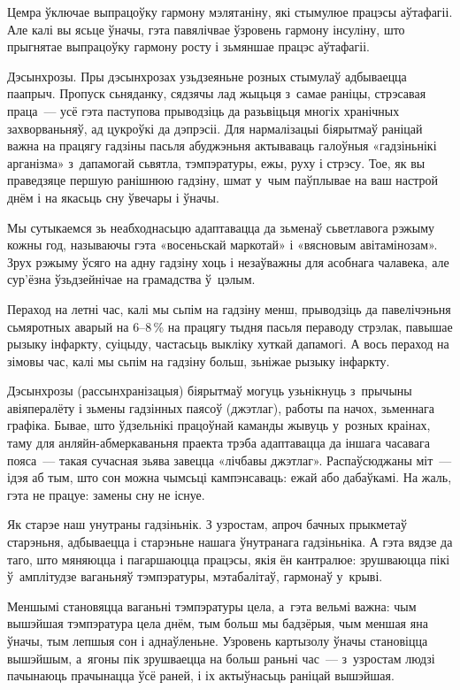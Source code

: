 Цемра ўключае выпрацоўку гармону мэлятаніну, які стымулюе працэсы аўтафагіі. Але калі вы ясьце ўначы, гэта павялічвае ўзровень гармону інсуліну, што прыгнятае выпрацоўку гармону росту і зьмяншае працэс аўтафагіі.

Дэсынхрозы. Пры дэсынхрозах узьдзеяньне розных стымулаў адбываецца паапрыч. Пропуск сьняданку, сядзячы лад жыцьця з~самае раніцы, стрэсавая праца~--- усё гэта паступова прыводзіць да разьвіцьця многіх хранічных захворваньняў, ад цукроўкі да дэпрэсіі. Для нармалізацыі біярытмаў раніцай важна на працягу гадзіны пасьля абуджэньня актываваць галоўныя «гадзіньнікі арганізма» з~дапамогай сьвятла, тэмпэратуры, ежы, руху і стрэсу. Тое, як вы праведзяце першую ранішнюю гадзіну, шмат у~чым паўплывае на ваш настрой днём і на якасьць сну ўвечары і ўначы.

Мы сутыкаемся зь неабходнасьцю адаптавацца да зьменаў сьветлавога рэжыму кожны год, называючы гэта «восеньскай маркотай» і «вясновым авітамінозам». Зрух рэжыму ўсяго на адну гадзіну хоць і незаўважны для асобнага чалавека, але сур'ёзна ўзьдзейнічае на грамадства ў~цэлым.

Пераход на летні час, калі мы сьпім на гадзіну менш, прыводзіць да павелічэньня сьмяротных аварый на 6--8\,\% на працягу тыдня пасьля пераводу стрэлак, павышае рызыку інфаркту, суіцыду, частасьць выкліку хуткай дапамогі. А вось пераход на зімовы час, калі мы сьпім на гадзіну больш, зьніжае рызыку інфаркту.

Дэсынхрозы (рассынхранізацыя) біярытмаў могуць узьнікнуць з~прычыны авіяпералёту і зьмены гадзінных паясоў (джэтлаг), работы па начох, зьменнага графіка. Бывае, што ўдзельнікі працоўнай каманды жывуць у~розных краінах, таму для анляйн-абмеркаваньня праекта трэба адаптавацца да іншага часавага пояса~--- такая сучасная зьява завецца «лічбавы джэтлаг». Распаўсюджаны міт~--- ідэя аб тым, што сон можна чымсьці кампэнсаваць: ежай або дабаўкамі. На жаль, гэта не працуе: замены сну не існуе.

Як старэе наш унутраны гадзіньнік. З узростам, апроч бачных прыкметаў старэньня, адбываецца і старэньне нашага ўнутранага гадзіньніка. А гэта вядзе да таго, што мяняюцца і пагаршаюцца працэсы, якія ён кантралюе: зрушваюцца пікі ў~амплітудзе ваганьняў тэмпэратуры, мэтабалітаў, гармонаў у~крыві.

Меншымі становяцца ваганьні тэмпэратуры цела, а~гэта вельмі важна: чым вышэйшая тэмпэратура цела днём, тым больш мы бадзёрыя, чым меншая яна ўначы, тым лепшыя сон і аднаўленьне. Узровень картызолу ўначы становіцца вышэйшым, а~ягоны пік зрушваецца на больш раньні час~--- з~узростам людзі пачынаюць прачынацца ўсё раней, і іх актыўнасьць раніцай вышэйшая.


